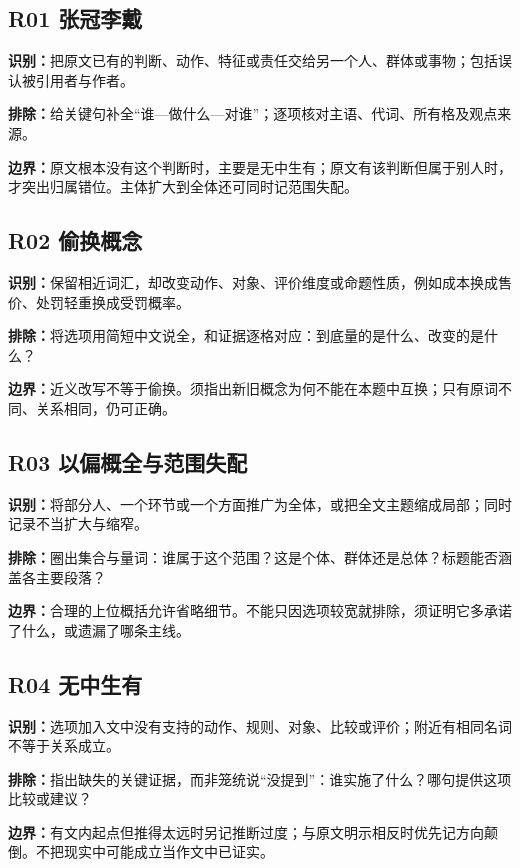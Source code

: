 \documentclass[11pt,a4paper]{article}
\begin{document}
\subsection{R01 张冠李戴}\label{cat-R01}
\noindent\textbf{识别：}把原文已有的判断、动作、特征或责任交给另一个人、群体或事物；包括误认被引用者与作者。\par
\noindent\textbf{排除：}给关键句补全“谁—做什么—对谁”；逐项核对主语、代词、所有格及观点来源。\par
\noindent\textbf{边界：}原文根本没有这个判断时，主要是无中生有；原文有该判断但属于别人时，才突出归属错位。主体扩大到全体还可同时记范围失配。\par
{}
\subsection{R02 偷换概念}\label{cat-R02}
\noindent\textbf{识别：}保留相近词汇，却改变动作、对象、评价维度或命题性质，例如成本换成售价、处罚轻重换成受罚概率。\par
\noindent\textbf{排除：}将选项用简短中文说全，和证据逐格对应：到底量的是什么、改变的是什么？\par
\noindent\textbf{边界：}近义改写不等于偷换。须指出新旧概念为何不能在本题中互换；只有原词不同、关系相同，仍可正确。\par
{}
\subsection{R03 以偏概全与范围失配}\label{cat-R03}
\noindent\textbf{识别：}将部分人、一个环节或一个方面推广为全体，或把全文主题缩成局部；同时记录不当扩大与缩窄。\par
\noindent\textbf{排除：}圈出集合与量词：谁属于这个范围？这是个体、群体还是总体？标题能否涵盖各主要段落？\par
\noindent\textbf{边界：}合理的上位概括允许省略细节。不能只因选项较宽就排除，须证明它多承诺了什么，或遗漏了哪条主线。\par
{}
\subsection{R04 无中生有}\label{cat-R04}
\noindent\textbf{识别：}选项加入文中没有支持的动作、规则、对象、比较或评价；附近有相同名词不等于关系成立。\par
\noindent\textbf{排除：}指出缺失的关键证据，而非笼统说“没提到”：谁实施了什么？哪句提供这项比较或建议？\par
\noindent\textbf{边界：}有文内起点但推得太远时另记推断过度；与原文明示相反时优先记方向颠倒。不把现实中可能成立当作文中已证实。\par
{}
\end{document}
